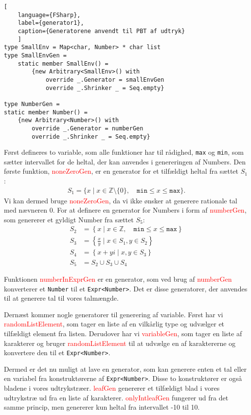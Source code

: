 \begin{lstlisting}[
    language={FSharp}, 
    label={generator1}, 
    caption={Generatorene anvendt til PBT af udtryk}
    ]
type SmallEnv = Map<char, Number> * char list
type SmallEnvGen =
    static member SmallEnv() =
        {new Arbitrary<SmallEnv>() with
            override _.Generator = smallEnvGen
            override _.Shrinker _ = Seq.empty}

type NumberGen =
static member Number() =
    {new Arbitrary<Number>() with
        override _.Generator = numberGen
        override _.Shrinker _ = Seq.empty}    
\end{lstlisting}

Først defineres to variable, som alle funktioner har til rådighed, \texttt{max} og \texttt{min}, som sætter intervallet for de heltal, der kan anvendes i genereringen af Numbers. 
Den første funktion, \textcolor{red}{noneZeroGen}, er en generator for et tilfældigt heltal fra sættet $S_1$:
\begin{gather*}
    S_1 = \{ x \mid x \in \mathbb{Z} \setminus \{0\}, \quad \texttt{min} \leq x \leq \texttt{max} \}.
\end{gather*}
Vi kan dermed bruge \textcolor{red}{noneZeroGen}, da vi ikke ønsker at generere rationale tal med nævneren 0. For at definere en generator for Numbers i form af \textcolor{red}{numberGen}, som genererer et gyldigt Number fra sættet $S_5$:
\begin{align*}
    S_2 &= \left\{ x \mid x \in \mathbb{Z}, \quad \texttt{min} \leq x \leq \texttt{max} \right\} \\
    S_3 &= \left\{ \frac{x}{y} \mid x \in S_1, y \in S_2 \right\} \\
    S_4 &= \left\{ x + yi \mid x, y \in S_3 \right\} \\
    S_5 &= S_2 \cup S_3 \cup S_4
\end{align*}

Funktionen \textcolor{red}{numberInExprGen} er en generator, som ved brug af \textcolor{red}{numberGen} konverterer et \texttt{Number} til et \texttt{Expr<Number>}. Det er disse generatorer, der anvendes til at generere tal til vores talmængde.

Dernæst kommer nogle generatorer til generering af variable. Først har vi \textcolor{red}{randomListElement}, som tager en liste af en vilkårlig type og udvælger et tilfældigt element fra listen. Derudover har vi \textcolor{red}{variableGen}, som tager en liste af karakterer og bruger \textcolor{red}{randomListElement} til at udvælge en af karaktererne og konvertere den til et \texttt{Expr<Number>}.

Dermed er det nu muligt at lave en generator, som kan generere enten et tal eller en variabel fra konstruktørerne af \texttt{Expr<Number>}. Disse to konstruktører er også bladene i vores udtrykstræer. \textcolor{red}{leafGen} genererer et tilfældigt blad i vores udtrykstræ ud fra en liste af karakterer. \textcolor{red}{onlyIntleafGen} fungerer ud fra det samme princip, men genererer kun heltal fra intervallet -10 til 10.

